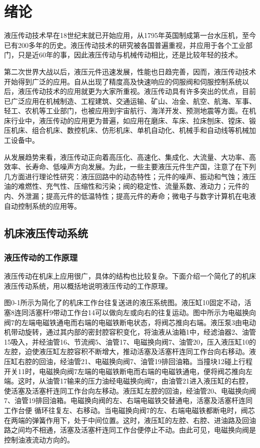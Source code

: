 \chapter{绪论}

    液压传动技术早在18世纪末就已开始应用，从1795年英国制成第一台水压机，至今已有200多年的历史。液压传动技术的研究被各国普遍重视，并应用于各个工业部门，只是近60年的事，因此液压传动与机械传动相比，还是比较年轻的技术。

    第二次世界大战以后，液压元件迅速发展，性能也日趋完善，因而，液压传动技术开始得到广泛的应用。自从出现了精度高及快速响应的伺服阀和伺服控制系统以后，液压传动技术的应用就更为大家所重视。液压传动具有许多突出的优点，目前已广泛应用在机械制造、工程建筑、交通运输、矿山、冶金、航空、航海、军事、轻工、农机等工业部门，也被应用到宇宙航行、海洋开发、预测地震等方面。在机床行业中，液压传动的应用更为普遍，如应用在磨床、车床、拉床刨床、镗床、锻压机床、组合机床、数控机床、仿形机床、单机自动化、机械手和自动线等机械加工设备中。

    从发展趋势来看，液压传动正向着高压化、高速化、集成化、大流量、大功率、高效率、长寿命、低噪声方向发展。为此，一些主要液压元件生产国，注意了在下列几方面进行理论性研究：液压回路中的动态特性；元件的噪声、振动和气蚀；液压油的难燃性、充气性、压缩性和污染；阀的稳定性、流量系数、液动力；元件的内、外泄漏；提高元件的低温特性；提高元件的寿命；微电子与数字计算机在电液自动控制系统的应用等。

\section{机床液压传动系统}
\subsection{液压传动的工作原理}

    液压传动在机床上应用很广，具体的结构也比较复杂。下面介绍一个简化了的机床液压传动系统，用以概括地说明液压传动的工作原理。

    图0-1所示为简化了的机床工作台往复送进的液压系统图。液压缸10固定不动，活塞8连同活塞杆9带动工作台14可以做向左或向右的往复运动。图中所示为电磁换向阀7的左端电磁铁通电而右端的电磁铁断电状态，将阀芯推向右端。液压泵3由电动机带动旋转，通过其内部的密封腔容积变化，将油液从油箱1中，经滤油器2、油管15吸入，并经油管16、节流阀5、油管17、电磁换向阀7、油管20，压入液压缸10的左腔，迫使液压缸左腔容积不断增大，推动活塞及活塞杆连同工作台向右移动。液压缸右腔的回油，经油管21、电磁换向阀7、油管19排回油箱。当撞块12碰上行程开关11时，电磁换向阀7左端的电磁铁断电而右端的电磁铁通电，便将阀芯推向左端。这时，从油管17输来的压力油经电磁换向阀7，由油管21进入液压缸的右腔，使活塞及活塞杆连同工作台向左移动。液压缸左腔的回油，经油管20、电磁换向阀7、油管19排回油箱。电磁换向阀的左、右端电磁铁交替通电，活塞及活塞杆连同工作台便
循环往复左、右移动。当电磁换向阀7的左、右端电磁铁都断电时，阀芯在两端的弹簧作用下，处于中间位置。这时，液压缸的左腔、右腔、进油路及回油路之间均不相通，活塞及活塞杆连同工作台便停止不动。由此可见，电磁换向阀是控制油液流动方向的。

